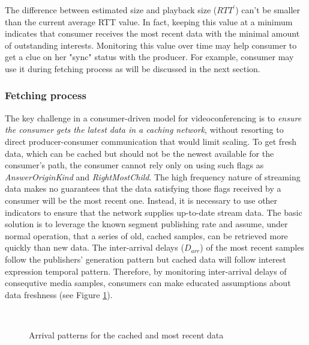 \documentclass[10pt]{proc}
\begin{document}
The difference between estimated size and playback size ($RTT^{\prime}$) can't be smaller than the current average RTT value. In fact, keeping this value at a minimum indicates that consumer receives the most recent data with the minimal amount of outstanding interests. Monitoring this value over time may help consumer to get a clue on her "sync" status with the producer. For example, consumer may use it during fetching process as will be discussed in the next section. 

\subsubsection{Fetching process}

The key challenge in a consumer-driven model for videoconferencing is to \emph{ensure the consumer gets the latest data in a caching network}, without resorting to direct producer-consumer communication that would limit scaling. To get fresh data, which can be cached but should not be the newest available for the consumer's path,  the consumer cannot rely only on using such flags as \textit{AnswerOriginKind} and \textit{RightMostChild}. The high frequency nature of streaming data makes no guarantees that the data satisfying those flags received by a consumer will be the most recent one. Instead, it is necessary to use other indicators to ensure that the network supplies up-to-date stream data. The basic solution is to leverage the known segment publishing rate and assume, under normal operation, that a series of old, cached samples, can be retrieved more quickly than new data. The inter-arrival delays ($D_{arr}$) of the most recent samples follow the publishers' generation pattern but cached data will follow interest expression temporal pattern. Therefore, by monitoring inter-arrival delays of consequtive media samples, consumers can make educated assumptions about data freshness (see Figure \ref{fig:inter-arrival}).

\begin{figure}[t!]
\centering

\\

\caption{Arrival patterns for the cached and most recent data}
\label{fig:inter-arrival}
\end{figure}
\end{document}
